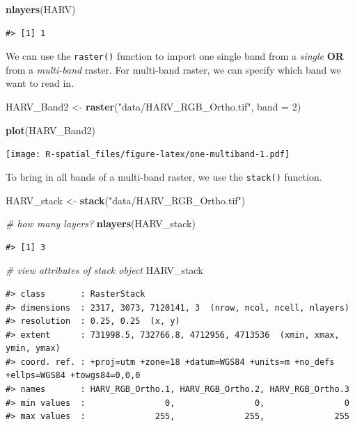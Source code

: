 \documentclass[]{book}
\newenvironment{Shaded}{\begin{snugshade}}{\end{snugshade}}
\newcommand{\KeywordTok}[1]{\textcolor[rgb]{0.13,0.29,0.53}{\textbf{#1}}}
\newcommand{\DataTypeTok}[1]{\textcolor[rgb]{0.13,0.29,0.53}{#1}}
\newcommand{\DecValTok}[1]{\textcolor[rgb]{0.00,0.00,0.81}{#1}}
\newcommand{\StringTok}[1]{\textcolor[rgb]{0.31,0.60,0.02}{#1}}
\newcommand{\CommentTok}[1]{\textcolor[rgb]{0.56,0.35,0.01}{\textit{#1}}}
\newcommand{\NormalTok}[1]{#1}
\theoremstyle{definition}
\theoremstyle{definition}
\theoremstyle{definition}
\theoremstyle{remark}
\begin{document}
\begin{Shaded}
\begin{Highlighting}[]
\KeywordTok{nlayers}\NormalTok{(HARV)}
\end{Highlighting}
\end{Shaded}

\begin{verbatim}
#> [1] 1
\end{verbatim}

We can use the \texttt{raster()} function to import one single band from
a \emph{single} \textbf{OR} from a \emph{multi-band} raster. For
multi-band raster, we can specify which band we want to read in.

\begin{Shaded}
\begin{Highlighting}[]
\NormalTok{HARV_Band2 <-}
\StringTok{  }\KeywordTok{raster}\NormalTok{(}\StringTok{"data/HARV_RGB_Ortho.tif"}\NormalTok{, }\DataTypeTok{band =} \DecValTok{2}\NormalTok{)}

\KeywordTok{plot}\NormalTok{(HARV_Band2)}
\end{Highlighting}
\end{Shaded}

\texttt{[image: R-spatial\_files/figure-latex/one-multiband-1.pdf]}

To bring in all bands of a multi-band raster, we use the
\texttt{stack()} function.

\begin{Shaded}
\begin{Highlighting}[]
\NormalTok{HARV_stack <-}
\StringTok{  }\KeywordTok{stack}\NormalTok{(}\StringTok{"data/HARV_RGB_Ortho.tif"}\NormalTok{)}

\CommentTok{# how many layers?}
\KeywordTok{nlayers}\NormalTok{(HARV_stack)}
\end{Highlighting}
\end{Shaded}

\begin{verbatim}
#> [1] 3
\end{verbatim}

\begin{Shaded}
\begin{Highlighting}[]
\CommentTok{# view attributes of stack object}
\NormalTok{HARV_stack}
\end{Highlighting}
\end{Shaded}

\begin{verbatim}
#> class       : RasterStack 
#> dimensions  : 2317, 3073, 7120141, 3  (nrow, ncol, ncell, nlayers)
#> resolution  : 0.25, 0.25  (x, y)
#> extent      : 731998.5, 732766.8, 4712956, 4713536  (xmin, xmax, ymin, ymax)
#> coord. ref. : +proj=utm +zone=18 +datum=WGS84 +units=m +no_defs +ellps=WGS84 +towgs84=0,0,0 
#> names       : HARV_RGB_Ortho.1, HARV_RGB_Ortho.2, HARV_RGB_Ortho.3 
#> min values  :                0,                0,                0 
#> max values  :              255,              255,              255
\end{verbatim}
\end{document}
